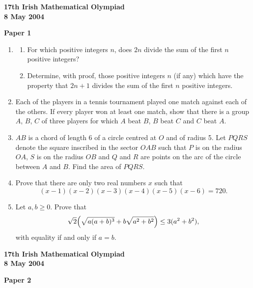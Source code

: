 \documentclass[12pt]{article}
\begin{document}
\begin{center}
{\large\bfseries 17th Irish Mathematical Olympiad\\8 May 2004}
\end{center}
\bigskip\noindent\textbf{Paper 1}\bigskip
\begin{enumerate}
\item \begin{enumerate}
\item[(a)] For which positive integers $n$, does $2n$ divide the sum of the first $n$ positive integers?
\item[(b)] Determine, with proof, those positive integers $n$ (if any) which have the property that $2n + 1$ divides the sum of the first $n$ positive integers.
\end{enumerate}

\item Each of the players in a tennis tournament played one match against each of the others. If every player won at least one match, show that there is a group $A$, $B$, $C$ of three players for which $A$ beat $B$, $B$ beat $C$ and $C$ beat $A$.

\item $AB$ is a chord of length 6 of a circle centred at $O$ and of radius 5. Let $PQRS$ denote the square inscribed in the sector $OAB$ such that $P$ is on the radius $OA$, $S$ is on the radius $OB$ and $Q$ and $R$ are points on the arc of the circle between $A$ and $B$. Find the area of $PQRS$.

\item Prove that there are only two real numbers $x$ such that
\[
(x-1)(x-2)(x-3)(x-4)(x-5)(x-6) = 720.
\]

\item Let $a, b \geq 0$. Prove that
\[
\sqrt{2}\Bigl(\sqrt{a(a+b)^3} + b\sqrt{a^2+b^2}\Bigr) \leq 3(a^2 + b^2),
\]
with equality if and only if $a = b$.

\end{enumerate}
\newpage
\begin{center}
{\large\bfseries 17th Irish Mathematical Olympiad\\8 May 2004}
\end{center}
\bigskip\noindent\textbf{Paper 2}\bigskip
\end{document}
